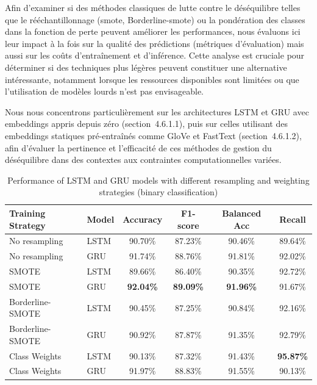 \documentclass[12pt]{report}
\begin{document}
Afin d’examiner si des méthodes classiques de lutte contre le déséquilibre telles que le rééchantillonnage (\gls{smote}, Borderline-\gls{smote}) ou la pondération des classes dans la fonction de perte peuvent améliorer les performances, nous évaluons ici leur impact à la fois sur la qualité des prédictions (métriques d’évaluation) mais aussi sur les coûts d’entraînement et d’inférence. Cette analyse est cruciale pour déterminer si des techniques plus légères peuvent constituer une alternative intéressante, notamment lorsque les ressources disponibles sont limitées ou que l’utilisation de modèles lourds n’est pas envisageable.

Nous nous concentrons particulièrement sur les architectures LSTM et GRU avec embeddings appris depuis zéro (section~4.6.1.1), puis sur celles utilisant des embeddings statiques pré-entraînés comme GloVe et FastText (section~4.6.1.2), afin d’évaluer la pertinence et l’efficacité de ces méthodes de gestion du déséquilibre dans des contextes aux contraintes computationnelles variées.

\begin{table}[H]
\centering
\scriptsize
\caption{Performance of LSTM and GRU models with different resampling and weighting strategies (binary classification)}
\begin{tabular}{|l|l|c|c|c|c|}
\hline
\textbf{Training Strategy} & \textbf{Model} & \textbf{Accuracy} & \textbf{F1-score} & \textbf{Balanced Acc} & \textbf{Recall} \\
\hline
No resampling & LSTM & 90.70\% & 87.23\% & 90.46\% & 89.64\% \\
No resampling & GRU  & 91.74\% & 88.76\% & 91.81\% & 92.02\% \\
\hline
SMOTE & LSTM & 89.66\% & 86.40\% & 90.35\% & 92.72\% \\
SMOTE & GRU  & \textbf{92.04\%} & \textbf{89.09\%} & \textbf{91.96\%} & 91.67\% \\
\hline
Borderline-SMOTE & LSTM & 90.45\% & 87.25\% & 90.84\% & 92.16\% \\
Borderline-SMOTE & GRU  & 90.92\% & 87.87\% & 91.35\% & 92.79\% \\
\hline
Class Weights & LSTM & 90.13\% & 87.32\% & 91.43\% & \textbf{95.87\%} \\
Class Weights & GRU  & 91.97\% & 88.83\% & 91.55\% & 90.13\% \\
\hline
\end{tabular}
\label{tab:performance_resampling}
\end{table}
\end{document}
